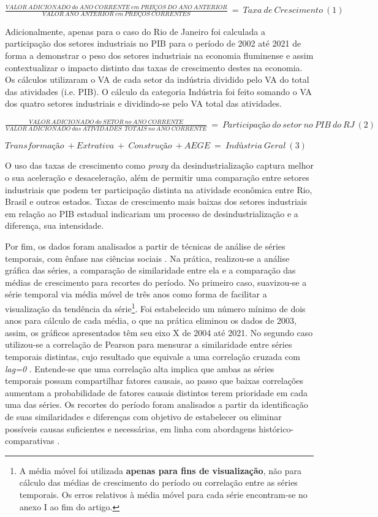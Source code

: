 {{\(\frac{VALOR\ ADICIONADO\ do\ ANO\ CORRENTE\ em\ PREÇOS\ DO\ ANO\ ANTERIOR}{VALOR\ ANO\ ANTERIOR\ em\ PREÇOS\ CORRENTES}\  = \ Taxa\ de\ Crescimento\ (1)\ \)

Adicionalmente, apenas para o caso do Rio de Janeiro foi calculada a
participação dos setores industriais no PIB para o período de 2002 até
2021 de forma a demonstrar o peso dos setores industriais na economia
fluminense e assim contextualizar o impacto distinto das taxas de
crescimento destes na economia. Os cálculos utilizaram o VA de cada
setor da indústria dividido pelo VA do total das atividades (i.e. PIB).
O cálculo da categoria Indústria foi feito somando o VA dos quatro
setores industriais e dividindo-se pelo VA total das atividades.

\(\frac{VALOR\ ADICIONADO\ do\ SETOR\ no\ ANO\ CORRENTE}{VALOR\ ADICIONADO\ das\ ATIVIDADES\ \ TOTAIS\ no\ ANO\ CORRENTE}\  = \ Participação\ do\ setor\ no\ PIB\ do\ RJ\ (2)\)

\(Transformação\  + Extrativa\  + \ Construção\  + AEGE\  = \ Indústria\ Geral\ (3)\)

O uso das taxas de crescimento como \emph{proxy} da desindustrialização
captura melhor o sua aceleração e desaceleração, além de permitir uma
comparação entre setores industriais que podem ter participação distinta
na atividade econômica entre Rio, Brasil e outros estados. Taxas de
crescimento mais baixas dos setores industriais em relação ao PIB
estadual indicariam um processo de desindustrialização e a diferença,
sua intensidade.

Por fim, os dados foram analisados a partir de técnicas de análise de
séries temporais, com ênfase nas ciências sociais
\citep{shin_time_2017}. Na
prática, realizou-se a análise gráfica das séries, a comparação de
similaridade entre ela e a comparação das médias de crescimento para
recortes do período. No primeiro caso, suavizou-se a série temporal via
média móvel de três anos como forma de facilitar a visualização da
tendência da série\footnote{A média móvel foi utilizada \textbf{apenas
  para fins de visualização}, não para cálculo das médias de crescimento
  do período ou correlação entre as séries temporais. Os erros relativos
  à média móvel para cada série encontram-se no anexo I ao fim do
  artigo.}. Foi estabelecido um número mínimo de dois anos para cálculo
de cada média, o que na prática eliminou os dados de 2003, assim, os
gráficos apresentados têm seu eixo X de 2004 até 2021. No segundo caso
utilizou-se a correlação de Pearson para mensurar a similaridade entre
séries temporais distintas, cujo resultado que equivale a uma correlação
cruzada com \emph{lag=0}
\citep{shin_time_2017}.
Entende-se que uma correlação alta implica que ambas as séries temporais
possam compartilhar fatores causais, ao passo que baixas correlações
aumentam a probabilidade de fatores causais distintos terem prioridade
em cada uma das séries. Os recortes do período foram analisados a partir
da identificação de suas similaridades e diferenças com objetivo de
estabelecer ou eliminar possíveis causas suficientes e necessárias, em
linha com abordagens histórico-comparativas
\citep{mahoney_comparative-historical_2004}.

}}
